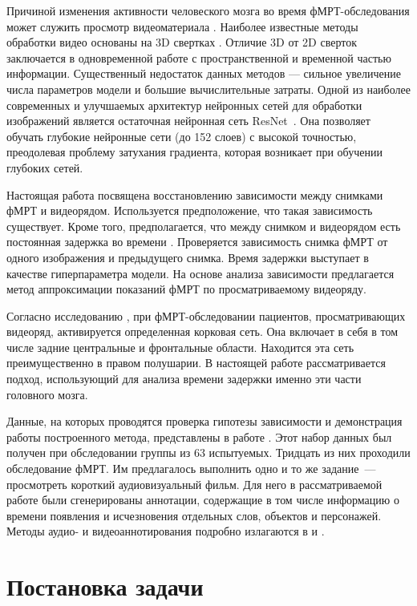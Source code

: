 \documentclass[a4paper, 12pt]{extarticle}
\begin{document}
Причиной изменения активности человеского мозга во время фМРТ-обследования
может служить просмотр видеоматериала \citep{decety1997brain}. Наиболее известные методы обработки видео основаны на 3D свертках \citep{tran2015learning}.
Отличие 3D от 2D сверток заключается в одновременной работе с пространственной и временной частью
информации. Существенный недостаток данных методов — сильное увеличение числа параметров модели и
большие вычислительные затраты. Одной из наиболее современных и улучшаемых архитектур
нейронных сетей для обработки изображений является остаточная нейронная сеть ResNet~\citep{he2015deep}.
Она позволяет обучать глубокие нейронные сети (до 152 слоев) с высокой точностью,
преодолевая проблему затухания градиента, которая возникает при обучении глубоких сетей.

Настоящая работа посвящена восстановлению зависимости между снимками фМРТ и видеорядом.
Используется предположение, что такая зависимость существует.
Кроме того, предполагается, что между снимком и видеорядом есть постоянная задержка во времени
\citep{Logothetis2003}.
Проверяется зависимость снимка фМРТ от одного изображения и предыдущего снимка.
Время задержки выступает в качестве гиперпараметра модели.
На основе анализа зависимости предлагается метод аппроксимации показаний фМРТ по
просматриваемому видеоряду.

Согласно исследованию \citep{anderson2006}, при фМРТ-обследовании пациентов,
просматривающих видеоряд, активируется определенная корковая сеть. Она включает
в себя в том числе задние центральные и фронтальные области. Находится эта сеть
преимущественно в правом полушарии. В настоящей работе рассматривается подход,
использующий для анализа времени задержки именно эти части головного мозга.

Данные, на которых проводятся проверка гипотезы зависимости и демонстрация работы построенного
метода, представлены в работе \citep{Berezutskaya2022}. Этот набор данных был получен при
обследовании группы из 63 испытуемых. Тридцать из них проходили обследование фМРТ.
Им предлагалось выполнить одно и то же задание~--- просмотреть короткий аудиовизуальный фильм.
Для него в рассматриваемой работе были сгенерированы аннотации, содержащие в том числе информацию о времени появления и исчезновения
отдельных слов, объектов и персонажей. Методы аудио- и видеоаннотирования подробно излагаются в
\citep{boersma2018praat} и \citep{Berezutskaya2020}.

\section{Постановка задачи}
\end{document}
